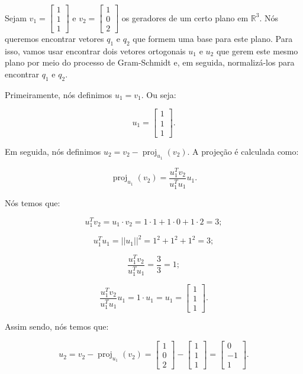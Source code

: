 \begin{Example}
	Sejam $v_1 = \begin{bmatrix}
		1 \\
		1 \\
		1
	\end{bmatrix}$ e $v_2 = \begin{bmatrix}
		1 \\
		0 \\
		2
	\end{bmatrix}$ os geradores de um certo plano em $\mathbb{R}^3$. Nós queremos encontrar vetores $q_1$ e $q_2$ que formem uma base para este plano. Para isso, vamos usar encontrar dois vetores ortogonais $u_1$ e $u_2$ que gerem este mesmo plano por meio do processo de Gram-Schmidt e, em seguida, normalizá-los para encontrar $q_1$ e $q_2$.
	
	Primeiramente, nós definimos $u_1 = v_1$. Ou seja:
	
	$$
	u_1 = \begin{bmatrix}
		1 \\
		1 \\
		1
	\end{bmatrix}.
	$$
	
	Em seguida, nós definimos $u_2 = v_2 - \operatorname{proj}_{u_1}(v_2)$. A projeção é calculada como:
	
	$$
	\operatorname{proj}_{u_1}(v_2) = \dfrac{u_1^Tv_2}{u_1^Tu_1}u_1.
	$$
	
	Nós temos que:
	
	$$
	u_1^Tv_2 = u_1\cdot v_2 = 1\cdot 1 + 1\cdot 0 + 1\cdot 2 = 3;
	$$
	
	$$
	u_1^Tu_1 = ||u_1||^2 = 1^2 + 1^2 + 1^2 = 3;
	$$
	
	$$
	\dfrac{u_1^Tv_2}{u_1^Tu_1} = \dfrac{3}{3} = 1;
	$$
	
	$$
	\dfrac{u_1^Tv_2}{u_1^Tu_1}u_1 = 1\cdot u_1 = u_1 = \begin{bmatrix}
		1 \\
		1 \\
		1
	\end{bmatrix}.
	$$
	
	Assim sendo, nós temos que:
	
	$$
	u_2 = v_2 - \operatorname{proj}_{u_1}(v_2) = \begin{bmatrix}
		1 \\
		0 \\
		2
	\end{bmatrix} - \begin{bmatrix}
		1 \\
		1 \\
		1
	\end{bmatrix} = \begin{bmatrix}
		0 \\
		-1 \\
		1
	\end{bmatrix}.
	$$
	

\end{Example}
